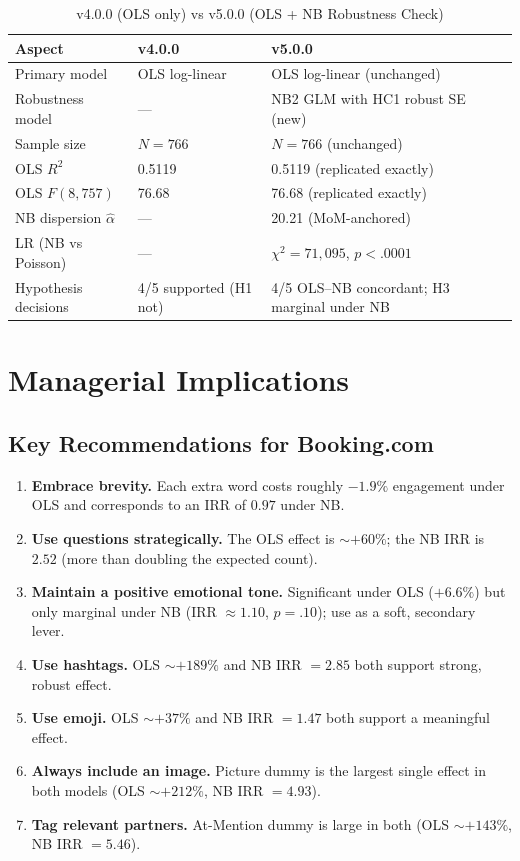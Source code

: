 \documentclass[12pt,a4paper]{article}
\begin{document}
\begin{table}[H]
\centering
\caption{v4.0.0 (OLS only) vs v5.0.0 (OLS + NB Robustness Check)}
\small
\begin{tabular}{lll}
\toprule
Aspect & v4.0.0 & v5.0.0 \\
\midrule
Primary model & OLS log-linear & OLS log-linear (unchanged) \\
Robustness model & --- & NB2 GLM with HC1 robust SE (new) \\
Sample size & $N=766$ & $N=766$ (unchanged) \\
OLS $R^2$ & 0.5119 & 0.5119 (replicated exactly) \\
OLS $F(8,757)$ & 76.68 & 76.68 (replicated exactly) \\
NB dispersion $\hat\alpha$ & --- & 20.21 (MoM-anchored) \\
LR (NB vs Poisson) & --- & $\chi^2 = 71{,}095$, $p<.0001$ \\
Hypothesis decisions & 4/5 supported (H1 not) & 4/5 OLS--NB concordant; H3 marginal under NB \\
\bottomrule
\end{tabular}
\end{table}

\section{Managerial Implications}

\subsection{Key Recommendations for Booking.com}

\begin{enumerate}
    \item \textbf{Embrace brevity.} Each extra word costs roughly $-1.9\%$ engagement under OLS and corresponds to an IRR of $0.97$ under NB.
    \item \textbf{Use questions strategically.} The OLS effect is $\sim+60\%$; the NB IRR is $2.52$ (more than doubling the expected count).
    \item \textbf{Maintain a positive emotional tone.} Significant under OLS ($+6.6\%$) but only marginal under NB (IRR $\approx 1.10$, $p=.10$); use as a soft, secondary lever.
    \item \textbf{Use hashtags.} OLS $\sim+189\%$ and NB IRR $=2.85$ both support strong, robust effect.
    \item \textbf{Use emoji.} OLS $\sim+37\%$ and NB IRR $=1.47$ both support a meaningful effect.
    \item \textbf{Always include an image.} Picture dummy is the largest single effect in both models (OLS $\sim +212\%$, NB IRR $=4.93$).
    \item \textbf{Tag relevant partners.} At-Mention dummy is large in both (OLS $\sim+143\%$, NB IRR $=5.46$).
\end{enumerate}
\end{document}
